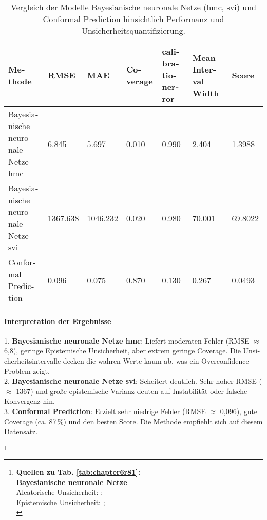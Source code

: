 \begin{otherlanguage}{ngerman}
\begin{table}[!htbp]
  \centering
  \footnotesize
  \begin{tabularx}{\textwidth}{|>{\arraybackslash}X|X|X|X|X|X|X|}
  \hline
  \textbf{Methode} & \textbf{RMSE} & \textbf{MAE} & \textbf{Coverage} & \textbf{\gls{calibrationerror}} & \textbf{Mean Interval Width} & \textbf{Score} \\
  \hline
  \gls{Bayesianische neuronale Netze} \gls{hmc} & 6.845 & 5.697 & 0.010 & 0.990 & 2.404 & 1.3988 \\
  \hline
  \gls{Bayesianische neuronale Netze} \gls{svi} & 1367.638 & 1046.232 & 0.020 & 0.980 & 70.001 & 69.8022 \\
  \hline
  \gls{Conformal Prediction} & 0.096 & 0.075 & 0.870 & 0.130 & 0.267 & 0.0493 \\
  \hline
  \end{tabularx}
  \caption{Vergleich der Modelle \gls{Bayesianische neuronale Netze} (\gls{hmc}, \gls{svi}) und \gls{Conformal Prediction} hinsichtlich Performanz und Unsicherheitsquantifizierung.}
  \label{tab:r8_results}
\end{table}

\paragraph{Interpretation der Ergebnisse}\par

1. \textbf{\gls{Bayesianische neuronale Netze} \gls{hmc}}: Liefert moderaten Fehler (RMSE $\approx$ 6{,}8), geringe \gls{Epistemische Unsicherheit}, aber extrem geringe Coverage. Die Unsicherheitsintervalle decken die wahren Werte kaum ab, was ein Overconfidence-Problem zeigt.\\
2. \textbf{\gls{Bayesianische neuronale Netze} \gls{svi}}: Scheitert deutlich. Sehr hoher RMSE ($\approx$ 1367) und große epistemische Varianz deuten auf Instabilität oder falsche Konvergenz hin.\\
3. \textbf{\gls{Conformal Prediction}}: Erzielt sehr niedrige Fehler (RMSE $\approx$ 0{,}096), gute Coverage (ca. 87\,\%) und den besten Score. Die Methode empfiehlt sich auf diesem Datensatz.



\footnote{%
\begin{minipage}[t]{\textwidth}
\scriptsize
\textbf{Quellen zu Tab. \ref{tab:chapter6r81}:}\\[0.5em]
\textbf{\gls{Bayesianische neuronale Netze}}\\
Aleatorische Unsicherheit: \parencite[Kap.~3]{blundell2015weight}; \parencite[S.~40–42]{gal2016uncertainty} \\
Epistemische Unsicherheit: \parencite[S.~40–42]{gal2016uncertainty}; \parencite{mackay1992practical} \\[0.5em]


\end{minipage}}
\end{otherlanguage}
